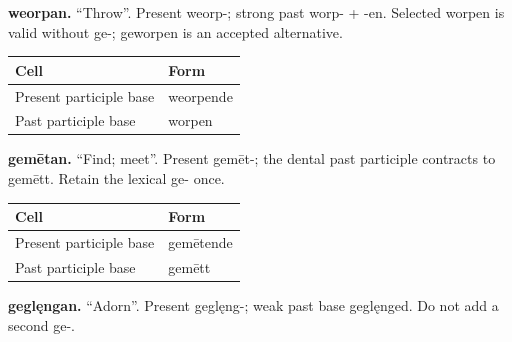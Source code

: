 \textbf{weorpan.} “Throw”. Present weorp-; strong past worp- + -en. Selected worpen is valid without ge-; geworpen is an accepted alternative.

\par\begingroup
\fontsize{10.5}{13.2}\selectfont
\setlength{\LTleft}{0pt}\setlength{\LTright}{\fill}
\noindent
\begin{tabular}{@{}>{\raggedright\arraybackslash}p{74.31mm}>{\raggedright\arraybackslash}p{46.88mm}@{}}
\toprule
\textbf{Cell} & \textbf{Form} \\
\midrule
Present participle base & weorpende \\
Past participle base & worpen \\
\bottomrule
\end{tabular}
\par\endgroup

\textbf{gemētan.} “Find; meet”. Present gemēt-; the dental past participle contracts to gemētt. Retain the lexical ge- once.

\par\begingroup
\fontsize{10.5}{13.2}\selectfont
\setlength{\LTleft}{0pt}\setlength{\LTright}{\fill}
\noindent
\begin{tabular}{@{}>{\raggedright\arraybackslash}p{74.31mm}>{\raggedright\arraybackslash}p{46.88mm}@{}}
\toprule
\textbf{Cell} & \textbf{Form} \\
\midrule
Present participle base & gemētende \\
Past participle base & gemētt \\
\bottomrule
\end{tabular}
\par\endgroup

\textbf{geglęngan.} “Adorn”. Present geglęng-; weak past base geglęnged. Do not add a second ge-.

